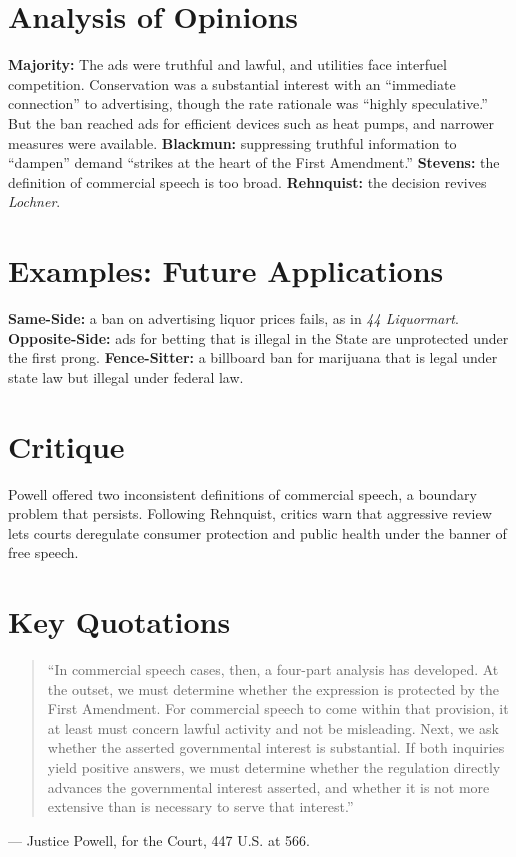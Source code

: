 \documentclass[12pt]{article}
\begin{document}
\section{Analysis of Opinions}
\textbf{Majority:} The ads were truthful and lawful, and utilities face interfuel competition. Conservation was a substantial interest with an ``immediate connection'' to advertising, though the rate rationale was ``highly speculative.'' But the ban reached ads for efficient devices such as heat pumps, and narrower measures were available. \textbf{Blackmun:} suppressing truthful information to ``dampen'' demand ``strikes at the heart of the First Amendment.'' \textbf{Stevens:} the definition of commercial speech is too broad. \textbf{Rehnquist:} the decision revives \textit{Lochner}.

\section{Examples: Future Applications}
\textbf{Same-Side:} a ban on advertising liquor prices fails, as in \textit{44 Liquormart}. \textbf{Opposite-Side:} ads for betting that is illegal in the State are unprotected under the first prong. \textbf{Fence-Sitter:} a billboard ban for marijuana that is legal under state law but illegal under federal law.

\section{Critique}
Powell offered two inconsistent definitions of commercial speech, a boundary problem that persists. Following Rehnquist, critics warn that aggressive review lets courts deregulate consumer protection and public health under the banner of free speech.

\section{Key Quotations}
\begin{quote}
``In commercial speech cases, then, a four-part analysis has developed. At the outset, we must determine whether the expression is protected by the First Amendment. For commercial speech to come within that provision, it at least must concern lawful activity and not be misleading. Next, we ask whether the asserted governmental interest is substantial. If both inquiries yield positive answers, we must determine whether the regulation directly advances the governmental interest asserted, and whether it is not more extensive than is necessary to serve that interest.''
\end{quote}
\noindent --- Justice Powell, for the Court, 447 U.S. at 566.
\end{document}
